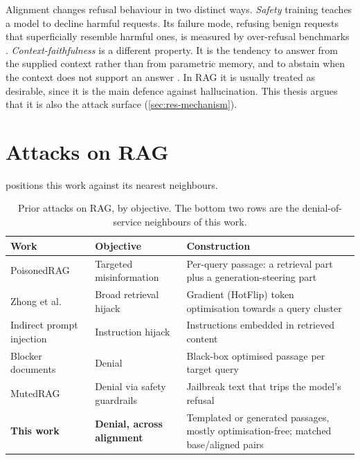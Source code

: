 Alignment changes refusal behaviour in two distinct ways. \emph{Safety}
training teaches a model to decline harmful requests. Its failure mode,
refusing benign requests that superficially resemble harmful ones, is measured
by over-refusal benchmarks \cite{rottger2024xstest,cui2024orbench}.
\emph{Context-faithfulness} is a different property. It is the tendency to
answer from the supplied context rather than from parametric memory, and to
abstain when the context does not support an answer
\cite{longpre2021entity,zhou2023contextfaithful,xie2024chameleon}. In RAG it is
usually treated as desirable, since it is the main defence against
hallucination. This thesis argues that it is also the attack surface
(\cref{sec:res-mechanism}).


\section{Attacks on RAG}
\label{sec:bg-attacks}

 positions this work against its nearest neighbours.

\begin{table}[ht]
\centering
\small
\caption[Prior attacks on RAG]{Prior attacks on RAG, by objective. The bottom
two rows are the denial-of-service neighbours of this work.}
\label{tab:related}
\begin{tabularx}{\textwidth}{@{}l l X@{}}
\toprule
Work & Objective & Construction \\
\midrule
PoisonedRAG \cite{zou2025poisonedrag} & Targeted misinformation & Per-query passage: a retrieval part plus a generation-steering part \\
Zhong et al.\ \cite{zhong2023poisoning} & Broad retrieval hijack & Gradient (HotFlip) token optimisation towards a query cluster \\
Indirect prompt injection \cite{greshake2023indirect} & Instruction hijack & Instructions embedded in retrieved content \\
\midrule
Blocker documents \cite{shafran2025jamming} & Denial & Black-box optimised passage per target query \\
MutedRAG \cite{suo2025mutedrag} & Denial via safety guardrails & Jailbreak text that trips the model's refusal \\
\textbf{This work} & \textbf{Denial, across alignment} & Templated or generated passages, mostly optimisation-free; matched base/aligned pairs \\
\bottomrule
\end{tabularx}
\end{table}

